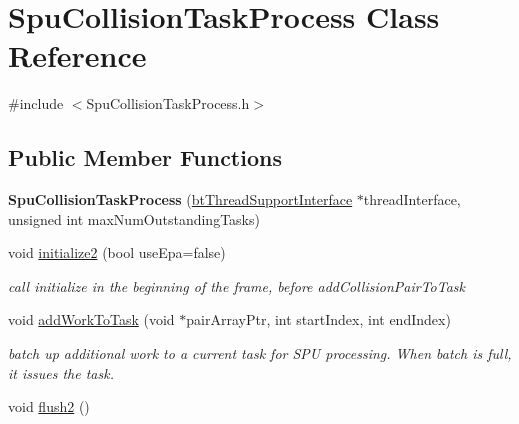 \hypertarget{classSpuCollisionTaskProcess}{}\section{Spu\+Collision\+Task\+Process Class Reference}
\label{classSpuCollisionTaskProcess}


{\ttfamily \#include $<$Spu\+Collision\+Task\+Process.\+h$>$}

\subsection*{Public Member Functions}
\begin{DoxyCompactItemize}
\item 
\mbox{\label{classSpuCollisionTaskProcess_ae2fd53d16de149643d8f538e183e48eb}} 
{\bfseries Spu\+Collision\+Task\+Process} (\hyperlink{classbtThreadSupportInterface}{bt\+Thread\+Support\+Interface} $\ast$thread\+Interface, unsigned int max\+Num\+Outstanding\+Tasks)
\item 
\mbox{\label{classSpuCollisionTaskProcess_afcdb413769d35c957ddc5c8ec2985588}} 
void \hyperlink{classSpuCollisionTaskProcess_afcdb413769d35c957ddc5c8ec2985588}{initialize2} (bool use\+Epa=false)
\begin{DoxyCompactList}\small\item\em call initialize in the beginning of the frame, before add\+Collision\+Pair\+To\+Task \end{DoxyCompactList}\item 
\mbox{\label{classSpuCollisionTaskProcess_a5a0c4e28e49f0ecfd3aa8255960c77d2}} 
void \hyperlink{classSpuCollisionTaskProcess_a5a0c4e28e49f0ecfd3aa8255960c77d2}{add\+Work\+To\+Task} (void $\ast$pair\+Array\+Ptr, int start\+Index, int end\+Index)
\begin{DoxyCompactList}\small\item\em batch up additional work to a current task for S\+PU processing. When batch is full, it issues the task. \end{DoxyCompactList}\item 
\mbox{\label{classSpuCollisionTaskProcess_afdb2b028ac84b0e90286eb6d4ed10fd3}} 
void \hyperlink{classSpuCollisionTaskProcess_afdb2b028ac84b0e90286eb6d4ed10fd3}{flush2} ()

\end{DoxyCompactItemize}
